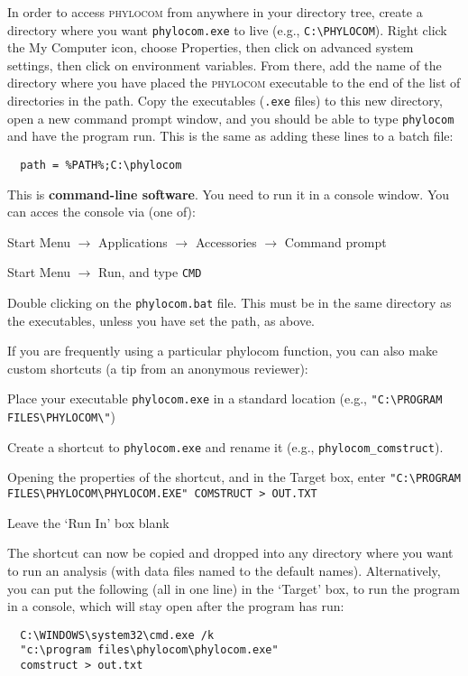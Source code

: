 \documentclass[12pt,letterpaper]{article}
\begin{document}
\label{unixpath}In order to access {\scshape phylocom} from anywhere in your directory
tree, create a directory where you want \verb|phylocom.exe| to live
(e.g., \verb|C:\PHYLOCOM|).  Right click the My Computer icon, choose
Properties, then click on advanced system settings, then click on
environment variables. From there, add the name of the directory where
you have placed the {\scshape phylocom} executable to the end of the
list of directories in the path. Copy the executables (\verb|.exe|
files) to this new directory, open a new command prompt window, and
you should be able to type \verb|phylocom| and have the program run.
This is the same as adding these lines to a batch file:
\begin{verbatim}
  path = %PATH%;C:\phylocom
\end{verbatim}
 
This is {\bf command-line software}. You need to run it in a console
window.  You can acces the console via (one of):
\begin{compactenum}
  \item Start Menu $\to$ Applications $\to$ Accessories $\to$ Command
    prompt
  \item Start Menu $\to$ Run, and type \verb|CMD| 
  \item Double clicking on the \verb|phylocom.bat| file.  This must be
    in the same directory as the executables, unless you have set the
    path, as above.
\end{compactenum}

If you are frequently using a particular {\sc phylocom} function, you
can also make custom shortcuts (a tip from an anonymous reviewer):
\begin{compactenum}
  \item Place your executable \verb|phylocom.exe| in a standard
    location (e.g., \verb|"C:\PROGRAM FILES\PHYLOCOM\"|)
  \item Create a shortcut to \verb|phylocom.exe| and rename it (e.g.,
    \verb|phylocom_comstruct|).
  \item Opening the properties of
    the shortcut, and in the Target box, enter
    \verb|"C:\PROGRAM FILES\PHYLOCOM\PHYLOCOM.EXE" COMSTRUCT > OUT.TXT|
  \item Leave the `Run In' box blank
\end{compactenum}
The shortcut can now be copied and dropped into any directory where
you want to run an analysis (with data files named to the default
names).  Alternatively, you can put the following (all in one line) in
the `Target' box, to run the program in a console, which will stay
open after the program has run:
\begin{verbatim} 
  C:\WINDOWS\system32\cmd.exe /k 
  "c:\program files\phylocom\phylocom.exe" 
  comstruct > out.txt
\end{verbatim}
\end{document}

